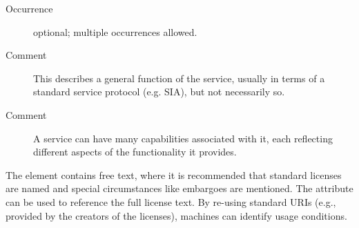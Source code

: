 \documentclass[11pt,a4paper]{ivoa}
\begin{document}
\begin{generated}
\begin{bigdescription}
\begin{description}
\item[Occurrence] optional; multiple occurrences allowed.
\item[Comment] 
                        This describes a general function of the
                        service, usually in terms of a standard
                        service protocol (e.g. SIA), but not
                        necessarily so.
                     
\item[Comment] 
                        A service can have many capabilities
                        associated with it, each reflecting different
                        aspects of the functionality it provides.  
                     

\end{description}


\end{bigdescription}\endgroup

\endgroup
\end{generated}


The  element contains free text, where it is recommended
that standard licenses are named and special circumstances like embargoes
are mentioned.  The  attribute can be used to
reference the
full license text.  By re-using standard URIs (e.g., provided by the
creators of the licenses), machines can
identify usage conditions.
\end{document}

